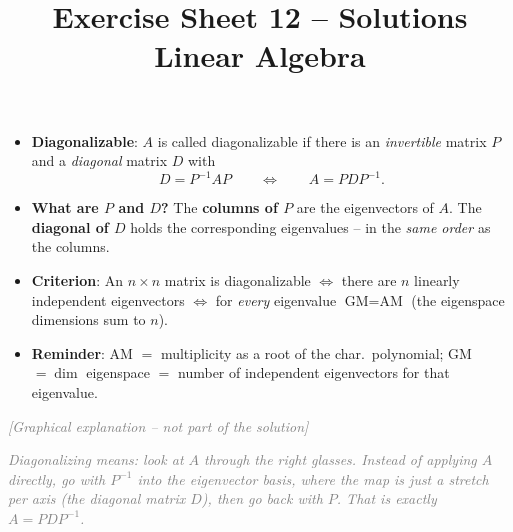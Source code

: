 \documentclass[a4paper,12pt]{article}
\title{Exercise Sheet 12 -- Solutions \\ \large Linear Algebra}
\author{}
\date{}
\newcommand{\grafik}{\textcolor{gray}{\small\textit{[Graphical explanation -- not part of the solution]}}}
\begin{document}
\maketitle

\begin{begriffe}
\begin{itemize}[leftmargin=*, nosep]
    \item \textbf{Diagonalizable}: $A$ is called diagonalizable if there is an \emph{invertible} matrix $P$ and a \emph{diagonal} matrix $D$ with
    \[
    D = P^{-1} A P \qquad\Longleftrightarrow\qquad A = P D P^{-1}.
    \]
    \item \textbf{What are $P$ and $D$?} The \textbf{columns of $P$} are the eigenvectors of $A$. The \textbf{diagonal of $D$} holds the corresponding eigenvalues -- in the \emph{same order} as the columns.
    \item \textbf{Criterion}: An $n\times n$ matrix is diagonalizable $\Leftrightarrow$ there are $n$ linearly independent eigenvectors $\Leftrightarrow$ for \emph{every} eigenvalue $\text{GM} = \text{AM}$ (the eigenspace dimensions sum to $n$).
    \item \textbf{Reminder}: AM $=$ multiplicity as a root of the char.\ polynomial; GM $= \dim$ eigenspace $=$ number of independent eigenvectors for that eigenvalue.
\end{itemize}
\end{begriffe}

\grafik

\begin{center}
\end{center}

\textcolor{gray}{\small\textit{Diagonalizing means: look at $A$ through the right glasses. Instead of applying $A$ directly, go with $P^{-1}$ into the eigenvector basis, where the map is just a \emph{stretch} per axis (the diagonal matrix $D$), then go back with $P$. That is exactly $A = P D P^{-1}$.}}
\end{document}
